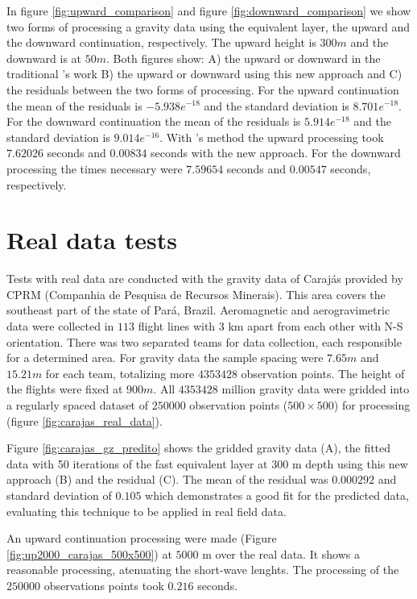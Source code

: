 \documentclass[paper]{geophysics}
\begin{document}
In figure \ref{fig:upward_comparison} and figure \ref{fig:downward_comparison} we show two forms of processing a gravity data using the equivalent layer, the upward and the downward continuation, respectively. The upward height is $300 m$ and the downward is at $50 m$. Both figures show: A) the upward or downward in the traditional \cite{siqueira2017fast}'s work B) the upward or downward using this new approach and C) the residuals between the two forms of processing. For the upward continuation the mean of the residuals is $-5.938e^{-18}$ and the standard deviation is $8.701e^{-18}$. For the downward continuation the mean of the residuals is $5.914e^{-18}$ and the standard deviation is $9.014e^{-16}$. With \cite{siqueira2017fast}'s method the upward processing took $7.62026$ seconds and $0.00834$ seconds with the new approach. For the downward processing the times necessary were $7.59654$ seconds and $0.00547$ seconds, respectively.

\section{Real data tests}
Tests with real data are conducted with the gravity data of Caraj\'as provided by CPRM (Companhia de Pesquisa de Recursos Minerais). This area covers the southeast part of the state of Par\'a, Brazil. Aeromagnetic and aerogravimetric data were collected in $113$ flight lines with $3$ km apart from each other with N-S orientation. There was two separated teams for data collection, each responsible for a determined area. For gravity data the sample spacing were $7.65 m$ and $15.21 m$ for each team, totalizing more $4353428$ observation points. The height of the flights were fixed at $900 m$. All $4353428$ million gravity data were gridded into a regularly spaced dataset of $250000$ observation points ($500 \times 500$) for processing (figure \ref{fig:carajas_real_data}).

Figure \ref{fig:carajas_gz_predito} shows the gridded gravity data (A), the fitted data with 50 iterations of the fast equivalent layer at $300$ m depth using this new approach (B) and the residual (C). The mean of the residual was $0.000292$ and standard deviation of $0.105$ which demonstrates a good fit for the predicted data, evaluating this technique to be applied in real field data.

An upward continuation processing were made (Figure \ref{fig:up2000_carajas_500x500}) at $5000$ m over the real data. It shows a reasonable processing, atenuating the short-wave lenghts. The processing of the $250000$ observations points took $0.216$ seconds.
\end{document}
